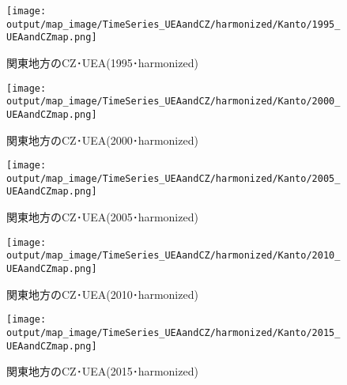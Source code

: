\documentclass{ltjsarticle}
\begin{document}
  \begin{figure}[pbth]
    \centering
    \texttt{[image: output/map\_image/TimeSeries\_UEAandCZ/harmonized/Kanto/1995\_UEAandCZmap.png]}
    \caption{\label{ham:tsK1995}関東地方のCZ･UEA(1995･harmonized)}
  \end{figure}
  
  \begin{figure}[pbth]
    \centering
    \texttt{[image: output/map\_image/TimeSeries\_UEAandCZ/harmonized/Kanto/2000\_UEAandCZmap.png]}
    \caption{\label{ham:tsK2000}関東地方のCZ･UEA(2000･harmonized)}
  \end{figure}
  
  \begin{figure}[pbth]
    \centering
    \texttt{[image: output/map\_image/TimeSeries\_UEAandCZ/harmonized/Kanto/2005\_UEAandCZmap.png]}
    \caption{\label{ham:tsK2005}関東地方のCZ･UEA(2005･harmonized)}
  \end{figure}
  
  \begin{figure}[pbth]
    \centering
    \texttt{[image: output/map\_image/TimeSeries\_UEAandCZ/harmonized/Kanto/2010\_UEAandCZmap.png]}
    \caption{\label{ham:tsK2010}関東地方のCZ･UEA(2010･harmonized)}
  \end{figure}
  
  \begin{figure}[pbth]
    \centering
    \texttt{[image: output/map\_image/TimeSeries\_UEAandCZ/harmonized/Kanto/2015\_UEAandCZmap.png]}
    \caption{\label{ham:tsK2015}関東地方のCZ･UEA(2015･harmonized)}
  \end{figure}
  
\clearpage
\end{document}
